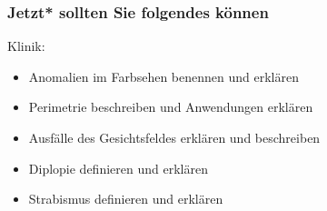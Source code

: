 \documentclass{beamer}
\begin{document}
\begin{frame}

 \frametitle{Jetzt* sollten Sie folgendes können}

 

\begin{block}{Klinik:}

\begin{itemize}
    
\item 
Anomalien im Farbsehen benennen und erklären
    \item 
Perimetrie beschreiben und Anwendungen erklären
    \item 
Ausfälle des Gesichtsfeldes erklären und beschreiben
    \item 
Diplopie definieren und erklären
    \item 
Strabismus definieren und erklären

\end{itemize}


\end{block}



\end{frame}
\end{document}
